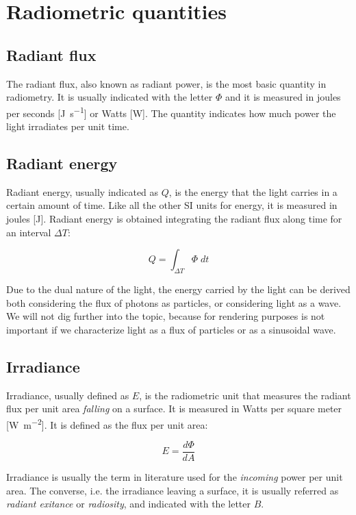 \section{Radiometric quantities}

\subsection{Radiant flux}
The radiant flux, also known as radiant power, is the most basic quantity in radiometry. It is usually indicated with the letter $\Phi$ and it is measured in joules per seconds [\si{\joule\per\second}] or Watts [\si{\watt}]. The quantity indicates how much power the light irradiates per unit time. 

\subsection{Radiant energy}
Radiant energy, usually indicated as $Q$, is the energy that the light carries in a certain amount of time. Like all the other SI units for energy, it is measured in joules [\si{\joule}]. Radiant energy is obtained integrating the radiant flux along time for an interval $\Delta T$:

$$
Q = \int_{\Delta T} \Phi \; dt
$$

Due to the dual nature of the light, the energy carried by the light can be derived both considering the flux of photons as particles, or considering light as a wave. We will not dig further into the topic, because for rendering purposes is not important if we characterize light as a flux of particles or as a sinusoidal wave.

\subsection{Irradiance}

Irradiance, usually defined as $E$, is the radiometric unit that measures the radiant flux per unit area \emph{falling} on a surface. It is measured in Watts per square meter [\si{\watt\per\square\meter}]. It is defined as the flux per unit area:

$$
E = \frac{d\Phi}{dA}
$$

Irradiance is usually the term in literature used for the \emph{incoming} power per unit area. The converse, i.e. the irradiance leaving a surface, it is usually referred as \emph{radiant exitance} or \emph{radiosity}, and indicated with the letter $B$.

